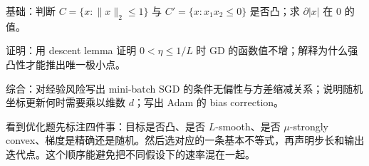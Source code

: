 \begin{examproblem}[分层自测]
基础：判断 \(C=\{x:\|x\|_2\le1\}\) 与 \(C'=\{x:x_1x_2\le0\}\) 是否凸；求 \(\partial |x|\) 在 \(0\) 的值。

证明：用 descent lemma 证明 \(0<\eta\le1/L\) 时 GD 的函数值不增；解释为什么强凸性才能推出唯一极小点。

综合：对经验风险写出 mini-batch SGD 的条件无偏性与方差缩减关系；说明随机坐标更新何时需要乘以维数 \(d\)；写出 Adam 的 bias correction。
\end{examproblem}

\begin{remark}[最后的答题清单]
看到优化题先标注四件事：目标是否凸、是否 \(L\)-smooth、是否 \(\mu\)-strongly convex、梯度是精确还是随机。然后选对应的一条基本不等式，再声明步长和输出迭代点。这个顺序能避免把不同假设下的速率混在一起。
\end{remark}
